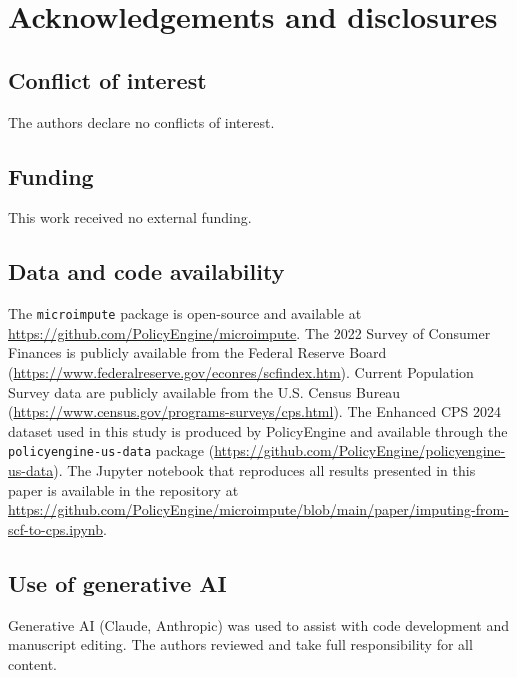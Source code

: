 \section*{Acknowledgements and disclosures}

\subsection*{Conflict of interest}
The authors declare no conflicts of interest.

\subsection*{Funding}
This work received no external funding.

\subsection*{Data and code availability}
\begin{sloppypar}
The \texttt{microimpute} package is open-source and available at \url{https://github.com/PolicyEngine/microimpute}. The 2022 Survey of Consumer Finances is publicly available from the Federal Reserve Board (\url{https://www.federalreserve.gov/econres/scfindex.htm}). Current Population Survey data are publicly available from the U.S. Census Bureau (\url{https://www.census.gov/programs-surveys/cps.html}). The Enhanced CPS 2024 dataset used in this study is produced by PolicyEngine and available through the \texttt{policyengine-us-data} package (\url{https://github.com/PolicyEngine/policyengine-us-data}). The Jupyter notebook that reproduces all results presented in this paper is available in the repository at \url{https://github.com/PolicyEngine/microimpute/blob/main/paper/imputing-from-scf-to-cps.ipynb}.
\end{sloppypar}

\subsection*{Use of generative AI}
Generative AI (Claude, Anthropic) was used to assist with code development and manuscript editing. The authors reviewed and take full responsibility for all content.
